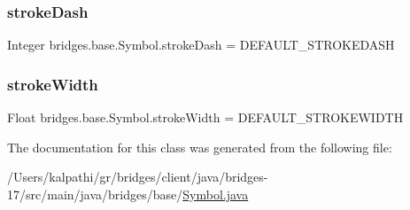\subsubsection{\texorpdfstring{stroke\+Dash}{strokeDash}}
{\footnotesize\ttfamily Integer bridges.\+base.\+Symbol.\+stroke\+Dash = D\+E\+F\+A\+U\+L\+T\+\_\+\+S\+T\+R\+O\+K\+E\+D\+A\+SH\hspace{0.3cm}{\ttfamily [protected]}}

\mbox{\label{classbridges_1_1base_1_1_symbol_a9f90a6efb9cb7a2f4e38c46862ae5a95}} 
\subsubsection{\texorpdfstring{stroke\+Width}{strokeWidth}}
{\footnotesize\ttfamily Float bridges.\+base.\+Symbol.\+stroke\+Width = D\+E\+F\+A\+U\+L\+T\+\_\+\+S\+T\+R\+O\+K\+E\+W\+I\+D\+TH\hspace{0.3cm}{\ttfamily [protected]}}



The documentation for this class was generated from the following file\+:\begin{DoxyCompactItemize}
\item 
/\+Users/kalpathi/gr/bridges/client/java/bridges-\/17/src/main/java/bridges/base/\mbox{\hyperlink{_symbol_8java}{Symbol.\+java}}\end{DoxyCompactItemize}
